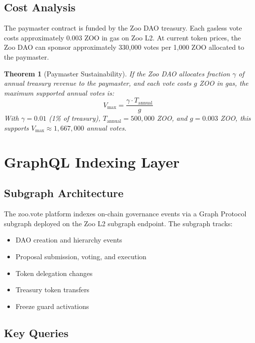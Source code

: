 \documentclass[11pt,letterpaper]{article}
\newtheorem{theorem}{Theorem}[section]
\begin{document}
\subsection{Cost Analysis}

The paymaster contract is funded by the Zoo DAO treasury. Each gasless vote costs approximately 0.003 ZOO in gas on Zoo L2. At current token prices, the Zoo DAO can sponsor approximately 330,000 votes per 1,000 ZOO allocated to the paymaster.

\begin{theorem}[Paymaster Sustainability]
If the Zoo DAO allocates fraction $\gamma$ of annual treasury revenue to the paymaster, and each vote costs $g$ ZOO in gas, the maximum supported annual votes is:
\begin{equation}
V_{\max} = \frac{\gamma \cdot T_{\text{annual}}}{g}
\end{equation}
With $\gamma = 0.01$ (1\% of treasury), $T_{\text{annual}} = 500{,}000$ ZOO, and $g = 0.003$ ZOO, this supports $V_{\max} \approx 1{,}667{,}000$ annual votes.
\end{theorem}

\section{GraphQL Indexing Layer}
\label{sec:graphql}

\subsection{Subgraph Architecture}

The zoo.vote platform indexes on-chain governance events via a Graph Protocol subgraph deployed on the Zoo L2 subgraph endpoint. The subgraph tracks:

\begin{itemize}
    \item DAO creation and hierarchy events
    \item Proposal submission, voting, and execution
    \item Token delegation changes
    \item Treasury token transfers
    \item Freeze guard activations
\end{itemize}

\subsection{Key Queries}
\end{document}
